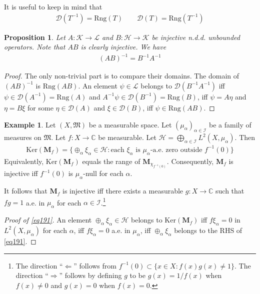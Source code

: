\documentclass[12pt,b5paper,notitlepage]{article}
\theoremstyle{definition}
\newtheorem{eg}[df]{Example}
\theoremstyle{plain}
\newtheorem{pp}[df]{Proposition}
\newcommand{\fk}{\mathfrak}
\newcommand{\Dom}{\mathscr{D}}
\newcommand{\Cbb}{\mathbb C}
\newcommand{\Ker}{\mathrm{Ker}}
\newcommand{\Rng}{\mathrm{Rng}}
\newcommand{\MH}{\mathcal H}
\newcommand{\MK}{\mathcal K}
\newcommand{\ML}{\mathcal L}
\newcommand{\SI}{\mathscr I}
\newcommand{\Mbf}{\mathbf M}
\numberwithin{equation}{section}
\begin{document}
It is useful to keep in mind that
\begin{gather}
\Dom(T^{-1})=\Rng(T)\qquad \Dom(T)=\Rng(T^{-1})
\end{gather}


\begin{pp}\label{lb455}
Let $A:\MK\rightarrow\ML$ and $B:\MH\rightarrow\MK$ be injective n.d.d. unbounded operators. Note that $AB$ is clearly injective. We have
\begin{align*}
(AB)^{-1}=B^{-1}A^{-1}
\end{align*}
\end{pp}

\begin{proof}
The only non-trivial part is to compare their domains. The domain of $(AB)^{-1}$ is $\Rng(AB)$. An element $\psi\in\ML$ belongs to $\Dom(B^{-1}A^{-1})$ iff $\psi\in\Dom(A^{-1})=\Rng(A)$ and $A^{-1}\psi\in\Dom(B^{-1})=\Rng(B)$, iff $\psi=A\eta$ and $\eta=B\xi$ for some $\eta\in\Dom(A)$ and $\xi\in\Dom(B)$, iff $\psi\in\Rng(AB)$.
\end{proof}







\begin{eg}\label{lb372}
Let $(X,\fk M)$ be a measurable space. Let $(\mu_\alpha)_{\alpha\in\SI}$ be a family of measures on $\fk M$. Let $f:X\rightarrow\Cbb$ be measurable. Let $\MH=\bigoplus_{\alpha\in\SI}L^2(X,\mu_\alpha)$. Then
\begin{align}\label{eq191}
\Ker(\Mbf_f)=\Big\{\oplus_\alpha\xi_\alpha\in\MH:\text{each }\xi_\alpha\text{ is }\mu_\alpha\text{-a.e. zero outside }f^{-1}(0) \Big\}
\end{align}
Equivalently, $\Ker(\Mbf_f)$ equals the range of $\Mbf_{\chi_{f^{-1}(0)}}$. Consequently, $\Mbf_f$ is injective iff $f^{-1}(0)$ is $\mu_\alpha$-null for each $\alpha$.
\end{eg}

It follows that $\Mbf_f$ is injective iff there exists a measurable $g:X\rightarrow\Cbb$ such that $fg=1$ a.e. in $\mu_\alpha$ for each $\alpha\in\SI$.\footnote{The direction ``$\Leftarrow$'' follows from $f^{-1}(0)\subset\{x\in X:f(x)g(x)\neq1\}$. The direction ``$\Rightarrow$'' follows by defining $g$ to be $g(x)=1/f(x)$ when $f(x)\neq0$ and $g(x)=0$ when $f(x)=0$.}


\begin{proof}[Proof of \eqref{eq191}]
An element $\oplus_\alpha\xi_\alpha\in\MH$ belongs to $\Ker(\Mbf_f)$ iff $f\xi_\alpha=0$ in $L^2(X,\mu_\alpha)$ for each $\alpha$, iff $f\xi_\alpha=0$ a.e. in $\mu_\alpha$, iff $\oplus_\alpha\xi_\alpha$ belongs to the RHS of \eqref{eq191}.
\end{proof}
\end{document}
